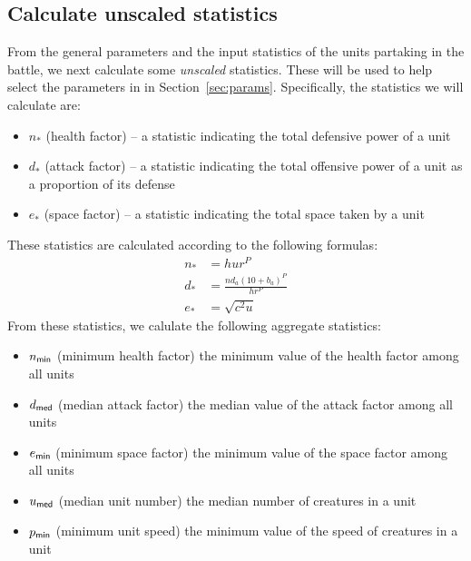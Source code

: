 \subsection{Calculate unscaled statistics}\label{sec:calculate-unscaled}

From the general parameters and the input statistics of the units
partaking in the battle,
we next calculate some \emph{unscaled} statistics.
These will be used to help select the parameters in in Section~\ref{sec:params}.
Specifically, the statistics we will calculate are:
%
\begin{itemize}
    \item $n_*$ (health factor) -- a statistic indicating the total defensive power of a unit
    \item $d_*$ (attack factor) -- a statistic indicating the total offensive power of a unit as a proportion of its defense
    \item $e_*$ (space factor) -- a statistic indicating the total space taken by a unit
\end{itemize}
%

These statistics are calculated according to the following formulas:
%
\begin{align*}
    n_* &= hur^P \\
    d_* &= \frac{
        n d_a (10 + b_a)^P
    }{
        h r^P
    } \\
    e_* &= \sqrt{c^2 u}
\end{align*}
%
From these statistics, we calulate the following aggregate statistics:
%
\begin{itemize}
    \item $n_{\textsf{min}}$ (minimum health factor) the minimum value of the health factor among all units
    \item $d_{\textsf{med}}$ (median attack factor) the median value of the attack factor among all units
    \item $e_{\textsf{min}}$ (minimum space factor) the minimum value of the space factor among all units
    \item $u_{\textsf{med}}$ (median unit number) the median number of creatures in a unit
    \item $p_{\textsf{min}}$ (minimum unit speed) the minimum value of the speed of creatures in a unit
\end{itemize}
